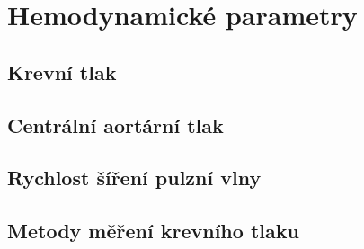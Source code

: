 \chapter{Hemodynamické parametry}
\section{Krevní tlak}
\section{Centrální aortární tlak}
\section{Rychlost šíření pulzní vlny}
\section{Metody měření krevního tlaku}